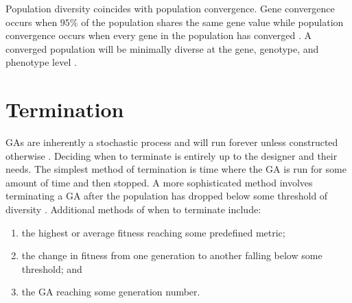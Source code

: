 Population diversity coincides with population convergence. Gene convergence occurs when $95\%$ of the population shares the same gene value while population convergence occurs when every gene in the population has converged \cite{Beasley93anoverview}. A converged population will be minimally diverse at the gene, genotype, and phenotype level \cite{ColinReeves}.

\section{Termination}

GAs are inherently a stochastic process and will run forever unless constructed otherwise \cite{ColinReeves}. Deciding when to terminate is entirely up to the designer and their needs. The simplest method of termination is time where the GA is run for some amount of time and then stopped. A more sophisticated method involves terminating a GA after the population has dropped below some threshold of diversity \cite{ColinReeves}. Additional methods of when to terminate include:
\begin{enumerate}
 \item the highest or average fitness reaching some predefined metric;
 \item the change in fitness from one generation to another falling below some threshold; and
 \item the GA reaching some generation number.
\end{enumerate}